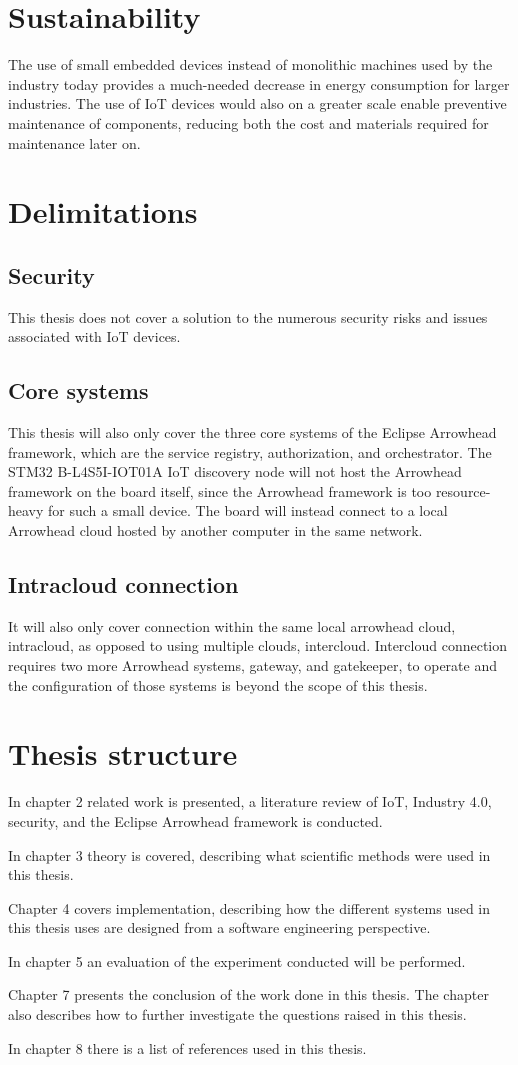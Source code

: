 \section{Sustainability}
The use of small embedded devices instead of monolithic machines used by the industry today provides a much-needed decrease in energy consumption for larger industries.
The use of IoT devices would also on a greater scale enable preventive maintenance of components, reducing both the cost and materials required for maintenance later on.
\section{Delimitations}
\subsection{Security}
This thesis does not cover a solution to the numerous security risks and issues associated with IoT devices. 
\subsection{Core systems}
This thesis will also only cover the three core systems of the Eclipse Arrowhead framework, which are the service registry, authorization, and orchestrator. 
The STM32 B-L4S5I-IOT01A IoT discovery node will not host the Arrowhead framework on the board itself, since the Arrowhead framework is too resource-heavy for such a small device.
The board will instead connect to a local Arrowhead cloud hosted by another computer in the same network. 
\subsection{Intracloud connection}
It will also only cover connection within the same local arrowhead cloud, intracloud, as opposed to using multiple clouds, intercloud.
Intercloud connection requires two more Arrowhead systems, gateway, and gatekeeper, to operate and the configuration of those systems is beyond the scope of this thesis.
\section{Thesis structure}
In chapter 2 related work is presented, a literature review of IoT, Industry 4.0, security, and the Eclipse Arrowhead framework is conducted. 

In chapter 3 theory is covered, describing what scientific methods were used in this thesis. 

Chapter 4 covers implementation, describing how the different systems used in this thesis uses are designed from a software engineering perspective.

In chapter 5 an evaluation of the experiment conducted will be performed. 

Chapter 7 presents the conclusion of the work done in this thesis. The chapter also describes how to further investigate the questions raised in this thesis. 

In chapter 8  there is a list of references used in this thesis.
